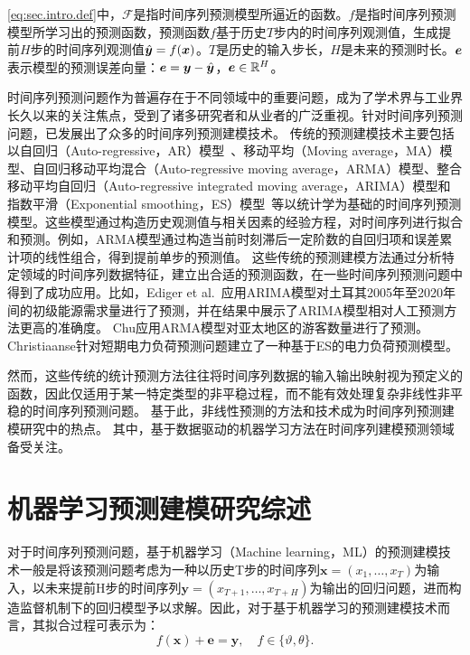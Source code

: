 \autoref{eq:sec.intro.def}中，$\mathcal{F}$是指时间序列预测模型所逼近的函数。\(f\)是指时间序列预测模型所学习出的预测函数，预测函数\(f\)基于历史$T$步内的时间序列观测值，生成提前$H$步的时间序列观测值\(\hat{\bm{y}} = f(\bm{x})\)。$T$是历史的输入步长，$H$是未来的预测时长。\(\bm{e}\)表示模型的预测误差向量：\( \bm{e} = \bm{y} - \hat{\bm{y}} \)，\(\bm{e} \in \mathbb{R}^{H}\)。

时间序列预测问题作为普遍存在于不同领域中的重要问题，成为了学术界与工业界长久以来的关注焦点，受到了诸多研究者和从业者的广泛重视。针对时间序列预测问题，已发展出了众多的时间序列预测建模技术。
传统的预测建模技术主要包括以自回归（Auto-regressive，AR）模型~\cite{boxTime2011}、移动平均（Moving average，MA）模型\cite{gershenfeldFuture1993}、自回归移动平均混合（Auto-regressive moving average，ARMA）模型\cite{chuForecasting2009}、整合移动平均自回归（Auto-regressive integrated moving average，ARIMA）模型\cite{floresEvolutive2012}和指数平滑（Exponential smoothing，ES）模型~\cite{gardnerjrExponential1985,gardnerExponential2006}等以统计学为基础的时间序列预测模型。这些模型通过构造历史观测值与相关因素的经验方程，对时间序列进行拟合和预测。例如，ARMA模型通过构造当前时刻滞后一定阶数的自回归项和误差累计项的线性组合，得到提前单步的预测值。
这些传统的预测建模方法通过分析特定领域的时间序列数据特征，建立出合适的预测函数，在一些时间序列预测问题中得到了成功应用。比如，Ediger et al.~\cite{edigerARIMA2007}应用ARIMA模型对土耳其2005年至2020年间的初级能源需求量进行了预测，并在结果中展示了ARIMA模型相对人工预测方法更高的准确度。
Chu\cite{chuForecasting2009}应用ARMA模型对亚太地区的游客数量进行了预测。
Christiaanse\cite{christiaanseShortTerm1971}针对短期电力负荷预测问题建立了一种基于ES的电力负荷预测模型。

然而，这些传统的统计预测方法往往将时间序列数据的输入输出映射视为预定义的函数，因此仅适用于某一特定类型的非平稳过程，而不能有效处理复杂非线性非平稳的时间序列预测问题\cite{boxTime2011}。
基于此，非线性预测的方法和技术成为时间序列预测建模研究中的热点。
其中，基于数据驱动的机器学习方法在时间序列建模预测领域备受关注。


\section{机器学习预测建模研究综述\label{sec:ch.intro.ml}}
对于时间序列预测问题，基于机器学习（Machine learning，ML）的预测建模技术一般是将该预测问题考虑为一种以历史T步的时间序列$\bm{x} = (x_1, \ldots, x_T)$为输入，以未来提前H步的时间序列$\bm{y} = (x_{T+1},\ldots,x_{T+H})$为输出的回归问题，进而构造监督机制下的回归模型予以求解。因此，对于基于机器学习的预测建模技术而言，其拟合过程可表示为：
\begin{equation}
    f(\bm x) + \bm e = \bm y, \quad f \in \{\vartheta, \theta\}\label{eq:sec.intro.ml}.
\end{equation}

